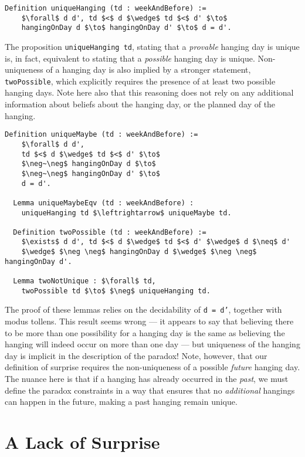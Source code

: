 \documentclass[runningheads]{llncs}
\begin{document}
\begin{lstlisting}[mathescape=true]
  Definition uniqueHanging (td : weekAndBefore) :=
    $\forall$ d d', td $<$ d $\wedge$ td $<$ d' $\to$
    hangingOnDay d $\to$ hangingOnDay d' $\to$ d = d'.
\end{lstlisting}

The proposition {\tt uniqueHanging td}, stating that
a \emph{provable} hanging day is unique is, in fact, equivalent to stating
that a \emph{possible} hanging day is unique. Non-uniqueness of a hanging day
is also implied by a stronger statement, {\tt twoPossible}, which explicitly
requires the presence of at least two possible hanging days.
Note here also that this reasoning does not rely on any additional information about
beliefs about the hanging day, or the planned day of the hanging.

\begin{lstlisting}[mathescape=true]
  Definition uniqueMaybe (td : weekAndBefore) :=
    $\forall$ d d',
    td $<$ d $\wedge$ td $<$ d' $\to$
    $\neg~\neg$ hangingOnDay d $\to$
    $\neg~\neg$ hangingOnDay d' $\to$
    d = d'.

  Lemma uniqueMaybeEqv (td : weekAndBefore) :
    uniqueHanging td $\leftrightarrow$ uniqueMaybe td.

  Definition twoPossible (td : weekAndBefore) :=
    $\exists$ d d', td $<$ d $\wedge$ td $<$ d' $\wedge$ d $\neq$ d'
    $\wedge$ $\neg \neg$ hangingOnDay d $\wedge$ $\neg \neg$ hangingOnDay d'.

  Lemma twoNotUnique : $\forall$ td,
    twoPossible td $\to$ $\neg$ uniqueHanging td.
\end{lstlisting}

The proof of these lemmas relies on the decidability of
{\tt d = d'}, together with modus tollens. This result seems wrong --- it appears to
say that believing there to be more than one possibility for a hanging day
is the same as believing the hanging will indeed occur on more than one day --- but
uniqueness of the hanging day is implicit in the description of the paradox!
Note, however, that our definition of
surprise requires the non-uniqueness of a possible \emph{future} hanging
day. The nuance here is that if a hanging
has already occurred in the \emph{past}, we must define the paradox constraints
in a way that ensures that no \emph{additional} hangings can happen in the future,
making a past hanging remain unique.

\section{A Lack of Surprise}
\label{sec:lack}
\end{document}
